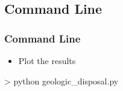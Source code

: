 \documentclass{beamer}
\begin{document}
\subsection{Command Line}
\begin{frame}[fragile]\frametitle{Command Line}

\begin{itemize}
  \item Plot the results
\end{itemize}

\begin{semiverbatim}
> python geologic_disposal.py
\end{semiverbatim}

\end{frame}

\end{document}
